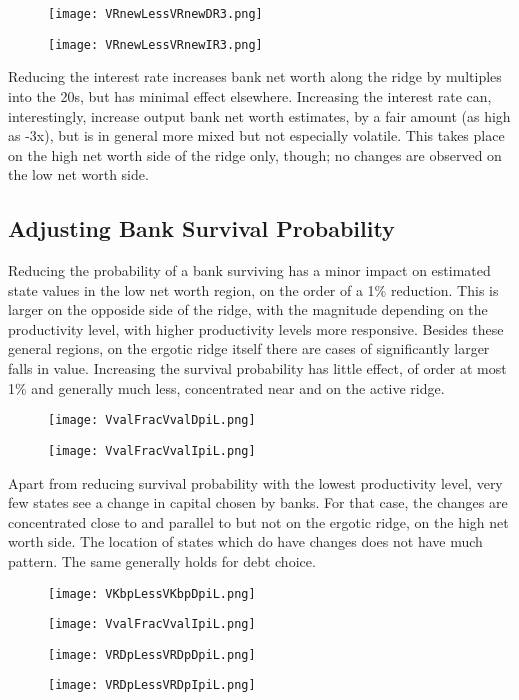 \documentclass[english]{article}
\begin{document}
\begin{figure}[H]
\centering
		\texttt{[image: VRnewLessVRnewDR3.png]}
\end{figure}
\begin{figure}[H]
\centering
		\texttt{[image: VRnewLessVRnewIR3.png]}
\end{figure}

Reducing the interest rate increases bank net worth along the ridge by multiples into the 20s, but has 
minimal effect elsewhere. Increasing the interest rate can, interestingly, increase output bank net worth 
estimates, by a fair amount (as high as -3x), but is in general more mixed but not especially volatile. This takes 
place on the high net worth side of the ridge only, though; no changes are observed on the low net worth side.

\subsection{Adjusting Bank Survival Probability}
Reducing the probability of a bank surviving has a minor impact on estimated state values in the low net worth 
region, on the order of a 1\% reduction. This is larger on the opposide side of the ridge, with the magnitude 
depending on the productivity level, with higher productivity levels more responsive. Besides these general 
regions, on the ergotic ridge itself there are cases of significantly larger falls in value. Increasing the survival 
probability has little effect, of order at most 1\% and generally much less, concentrated near and on the active
ridge.

\begin{figure}[H]
\centering
		\texttt{[image: VvalFracVvalDpiL.png]}
\end{figure}
\begin{figure}[H]
\centering
		\texttt{[image: VvalFracVvalIpiL.png]}
\end{figure}

Apart from reducing survival probability with the lowest productivity level, very few states 
see a change in capital chosen by banks. For that case, the changes are concentrated 
close to and parallel to but not on the ergotic ridge, on the high net worth side. The location
of states which do have changes does not have much pattern. The same generally holds for debt choice.

\begin{figure}[H]
\centering
		\texttt{[image: VKbpLessVKbpDpiL.png]}
\end{figure}
\begin{figure}[H]
\centering
		\texttt{[image: VvalFracVvalIpiL.png]}
\end{figure}
\begin{figure}[H]
\centering
		\texttt{[image: VRDpLessVRDpDpiL.png]}
\end{figure}
\begin{figure}[H]
\centering
		\texttt{[image: VRDpLessVRDpIpiL.png]}
\end{figure}
\end{document}
